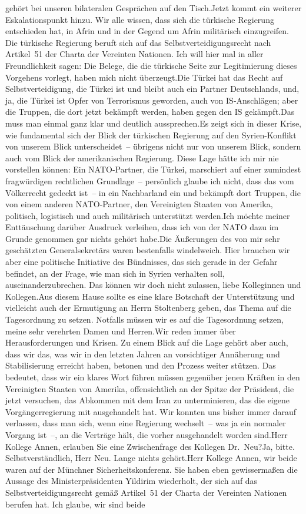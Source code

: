 \documentclass{article}
\begin{document}
gehört bei unseren bilateralen Gesprächen auf den Tisch.Jetzt kommt ein weiterer Eskalationspunkt hinzu. Wir alle wissen, dass sich die türkische Regierung entschieden hat, in Afrin und in der Gegend um Afrin militärisch einzugreifen. Die türkische Regierung beruft sich auf das Selbstverteidigungsrecht nach Artikel 51 der Charta der Vereinten Nationen. Ich will hier mal in aller Freundlichkeit sagen: Die Belege, die die türkische Seite zur Legitimierung dieses Vorgehens vorlegt, haben mich nicht überzeugt.Die Türkei hat das Recht auf Selbstverteidigung, die Türkei ist und bleibt auch ein Partner Deutschlands, und, ja, die Türkei ist Opfer von Terrorismus geworden, auch von IS-Anschlägen; aber die Truppen, die dort jetzt bekämpft werden, haben gegen den IS gekämpft.Das muss man einmal ganz klar und deutlich aussprechen.Es zeigt sich in dieser Krise, wie fundamental sich der Blick der türkischen Regierung auf den Syrien-Konflikt von unserem Blick unterscheidet – übrigens nicht nur von unserem Blick, sondern auch vom Blick der amerikanischen Regierung. Diese Lage hätte ich mir nie vorstellen können: Ein NATO-Partner, die Türkei, marschiert auf einer zumindest fragwürdigen rechtlichen Grundlage – persönlich glaube ich nicht, dass das vom Völkerrecht gedeckt ist – in ein Nachbarland ein und bekämpft dort Truppen, die von einem anderen NATO-Partner, den Vereinigten Staaten von Amerika, politisch, logistisch und auch militärisch unterstützt werden.Ich möchte meiner Enttäuschung darüber Ausdruck verleihen, dass ich von der NATO dazu im Grunde genommen gar nichts gehört habe.Die Äußerungen des von mir sehr geschätzten Generalsekretärs waren bestenfalls windelweich. Hier brauchen wir aber eine politische Initiative des Bündnisses, das sich gerade in der Gefahr befindet, an der Frage, wie man sich in Syrien verhalten soll, auseinanderzubrechen. Das können wir doch nicht zulassen, liebe Kolleginnen und Kollegen.Aus diesem Hause sollte es eine klare Botschaft der Unterstützung und vielleicht auch der Ermutigung an Herrn Stoltenberg geben, das Thema auf die Tagesordnung zu setzen. Notfalls müssen wir es auf die Tagesordnung setzen, meine sehr verehrten Damen und Herren.Wir reden immer über Herausforderungen und Krisen. Zu einem Blick auf die Lage gehört aber auch, dass wir das, was wir in den letzten Jahren an vorsichtiger Annäherung und Stabilisierung erreicht haben, betonen und den Prozess weiter stützen. Das bedeutet, dass wir ein klares Wort führen müssen gegenüber jenen Kräften in den Vereinigten Staaten von Amerika, offensichtlich an der Spitze der Präsident, die jetzt versuchen, das Abkommen mit dem Iran zu unterminieren, das die eigene Vorgängerregierung mit ausgehandelt hat. Wir konnten uns bisher immer darauf verlassen, dass man sich, wenn eine Regierung wechselt – was ja ein normaler Vorgang ist –, an die Verträge hält, die vorher ausgehandelt worden sind.Herr Kollege Annen, erlauben Sie eine Zwischenfrage des Kollegen Dr. Neu?Ja, bitte. Selbstverständlich, Herr Neu. Lange nichts gehört.Herr Kollege Annen, wir beide waren auf der Münchner Sicherheitskonferenz. Sie haben eben gewissermaßen die Aussage des Ministerpräsidenten Yildirim wiederholt, der sich auf das Selbstverteidigungsrecht gemäß Artikel 51 der Charta der Vereinten Nationen berufen hat. Ich glaube, wir sind beide 
\end{document}
